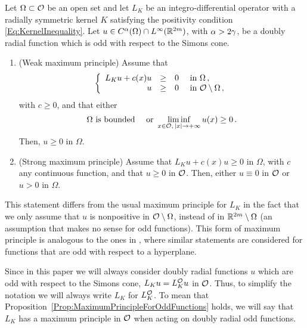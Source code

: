 \begin{proposition}
	\label{Prop:MaximumPrincipleForOddFunctions} Let $\Omega \subset \mathcal{O}$ be an open set and let $L_K$ be an integro-differential operator with a radially symmetric kernel $K$ satisfying the positivity condition \eqref{Eq:KernelInequality}.  Let $u\in C^{\alpha}(\Omega)\cap L^\infty(\mathbb{R}^{2m})$, with $\alpha > 2\gamma$, be a doubly radial function which is odd with respect to the Simons cone. 
	
	\begin{enumerate}[label=(\roman{*})]
		\item  (Weak maximum principle)
		Assume that
		$$
		\left\{\begin{array}{rcll}
		L_K u + c(x) u & \geq & 0 & \text{ in } \Omega\,,\\
		u & \geq & 0 & \text{ in } \mathcal{O} \setminus \Omega\,,
		\end{array} \right.
		$$
		with $c \geq 0$, and that either
		$$
		\Omega \text{ is bounded} \quad \text{ or } \liminf_{x \in \mathcal{O},\,|x|\to +\infty} u(x) \geq 0\,.
		$$
		Then, $u \geq 0$ in $\Omega$.
		
		\item (Strong maximum principle)  
		Assume that $L_K u + c(x) u\geq 0$ in $\Omega$, with $c$ any continuous function, and that $u\geq 0$ in $\mathcal{O}$. Then, either $u\equiv 0$ in $\mathcal{O}$ or $u > 0$ in $\Omega$.
	\end{enumerate} 
\end{proposition}

This statement differs from the usual maximum principle for $L_K$ in the fact that we only assume that $u$ is nonpositive in $\mathcal{O}\setminus \Omega$, instead of in $\mathbb{R}^{2m}\setminus \Omega$ (an assumption that makes no sense for odd functions). This form of maximum principle is analogous to the ones in \cite{ChenLiLi, JarohsWeth}, where similar statements are considered for functions that are odd with respect to a hyperplane.

Since in this paper we will always consider doubly radial functions $u$ which are odd with respect to the Simons cone, $L_K u =L_K^{\mathcal{O}} u$ in $\mathcal{O}$. Thus, to simplify the notation we will always write $L_K$ for $L_K^{\mathcal{O}}$. To mean that Proposition~\ref{Prop:MaximumPrincipleForOddFunctions} holds, we will say that $L_K$ has a maximum principle in $\mathcal{O}$ when acting on doubly radial odd functions.

